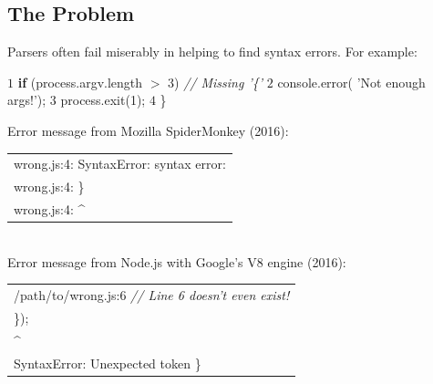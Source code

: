 \documentclass[a0,portrait]{a0poster}
\newcommand\tab[1][1cm]{\hspace*{#1}}
\newcommand{\textincon}[1]{%
{\fontfamily{zi4}\selectfont #1}}
\begin{document}
\vspace{1cm} %


\begin{multicols}{2} %


\color{Navy} %
\section*{The Problem}
\LARGE

Parsers often fail miserably in helping to find syntax errors. For example:

\color{Black}
\begin{algorithmic}
\State $1$ \textincon{\textbf{if} (process.argv.length $>$ 3)} \tab \textit{\color{red} // Missing '\{' }\color{Black}
\State $2$ \tab\tab \textincon{console.error(\color{NavyBlue} 'Not enough args!'}\color{Black});
\State $3$ \tab\tab \textincon{process.exit(1);}
\State $4$ \textincon{\}}
\end{algorithmic}

\color{NavyBlue} Error message from Mozilla SpiderMonkey (2016):\\\color{Black}
\begin{tabular}{|p{37cm}}
\tab \textincon{wrong.js:4: SyntaxError: syntax error:}\\
\tab \textincon{wrong.js:4: \}}\\
\tab \textincon{wrong.js:4: \^{}}
\end{tabular}
\\

\color{NavyBlue} Error message from Node.js with Google's V8 engine (2016):\\\color{Black}
\begin{tabular}{|p{37cm}}
\tab \textincon{/path/to/wrong.js:6} \tab \textit{\color{red} // Line 6 doesn't even exist!\color{Black}}\\
\tab \textincon{\});}\\
\tab \textincon{\^{}}\\
\tab \textincon{SyntaxError: Unexpected token \}}
\end{tabular}


\end{multicols}
\end{document}
